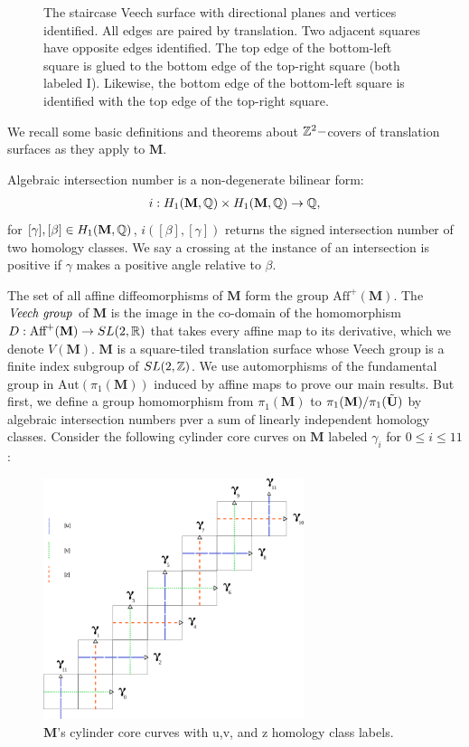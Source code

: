\documentclass[]{article}
\def\bM{\mathbf{M}}
\begin{document}
\begin{figure}[H]
\centering

\caption{The staircase Veech surface with directional planes and vertices identified. All edges are paired by translation. Two adjacent squares have opposite edges identified. The top edge of the bottom-left square is glued to the bottom edge of the top-right square (both labeled I). Likewise, the bottom edge of the bottom-left square is identified with the top edge of the top-right square.}
\label{fig:staircase}
\end{figure}

\noindent We recall some basic definitions and theorems about $\mathbb{Z}^2-$covers of translation surfaces as they apply to $\bM$. 

\begin{Def}
Algebraic intersection number is a non-degenerate bilinear form:
\begin{align*}
i:H_1(\bM,\QQ)\times H_1(\bM,\QQ)\rightarrow\QQ,
\end{align*}
for $[\gamma],[\beta]\in H_1(\mathbf{M},\mathbb{Q})$, $i([\beta],[\gamma])$ returns the signed intersection number of two homology classes. We say a crossing at the instance of an intersection is positive if $\gamma$ makes a positive angle relative to $\beta$. 
\end{Def}
The set of all affine diffeomorphisms of $\bM$ form the group $\text{Aff}^+(\bM)$. The $\emph{Veech group}$ of $\bM$ is the image in the co-domain of the homomorphism $D:\text{Aff}^+(\bM)\rightarrow SL(2,\RR)$ that takes every affine map to its derivative, which we denote $V(\bM)$. $\bM$ is a square-tiled translation surface whose Veech group is a finite index subgroup of $SL(2,\mathbb{Z})$. We use automorphisms of the fundamental group in $\text{Aut}(\pi_1(\bM))$ induced by affine maps to prove our main results. But first, we define a group homomorphism from $\pi_1(\bM)$ to $\pi_1(\bM)/\pi_1(\btU)$ by algebraic intersection numbers pver a sum of linearly independent homology classes. Consider the following cylinder core curves on $\bM$ labeled $\gamma_i$ for $0\leq i\leq 11$:
\begin{figure}[H]
\includegraphics[width=3in]{homologyclass.png}
\centering
\caption{$\bM$'s cylinder core curves with u,v, and z homology class labels.}
\label{fig:homology}
\end{figure}
\end{document}
